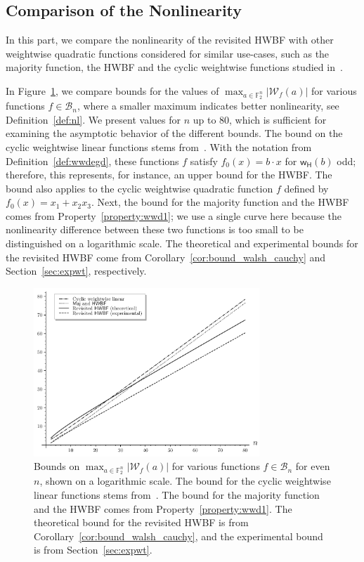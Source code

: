 \documentclass[runningheads,orivec]{llncs}
\newcommand{\BN}{\mathcal{B}_n}
\newcommand{\hwbf}{\textsf{HWBF}}
\newcommand{\w}{\mathsf{w_H}}
\newcommand{\wt}[1]{\mathcal W_{#1}}
\begin{document}
    \subsection{Comparison of the Nonlinearity}
    
    In this part, we compare the nonlinearity of the revisited \hwbf{} with other weightwise quadratic functions considered for similar use-cases, such as the majority function, the \hwbf{} and the cyclic weightwise functions studied in~\cite{DAM:MeaOza24}. 
    
    In Figure~\ref{fig:walsh_bound_comparison}, we compare bounds for the values of $\max_{a \in \mathbb{F}_2^n} |\wt f(a)|$ for various functions $f\in\BN$, where a smaller maximum indicates better nonlinearity, see Definition~\ref{def:nl}. We present values for $n$ up to $80$, which is sufficient for examining the asymptotic behavior of the different bounds. The bound on the cyclic weightwise linear functions stems from~\cite{DAM:MeaOza24}. With the notation from Definition~\ref{def:wwdegd}, these functions $f$ satisfy $f_0(x)=b\cdot x$ for $\w(b)$ odd; therefore, this represents, for instance, an upper bound for the \hwbf{}. The bound also applies to the cyclic weightwise quadratic function $f$ defined by $f_0(x) = x_1 + x_2 x_3$. Next, the bound for the majority function and the \hwbf{} comes from Property~\ref{property:wwd1}; we use a single curve here because the nonlinearity difference between these two functions is too small to be distinguished on a logarithmic scale. The theoretical and experimental bounds for the revisited \hwbf{} come from Corollary~\ref{cor:bound_walsh_cauchy} and Section~\ref{sec:expwt}, respectively.
    
    \begin{figure}
    	\centering
    	\includegraphics[width=8.5cm]{graphs/comparison_walsh_bound.pdf}
    	\caption{%
    		Bounds on $\max_{a \in \mathbb{F}_2^n} |\wt f(a)|$ for various functions $f\in\BN$ for even $n$, shown on a logarithmic scale. The bound for the cyclic weightwise linear functions stems from~\cite{DAM:MeaOza24}. The bound for the majority function and the \hwbf{} comes from Property~\ref{property:wwd1}. The theoretical bound for the revisited \hwbf{} is from Corollary~\ref{cor:bound_walsh_cauchy}, and the experimental bound is from Section~\ref{sec:expwt}.}
    	\label{fig:walsh_bound_comparison}
    \end{figure}
    
\end{document}
